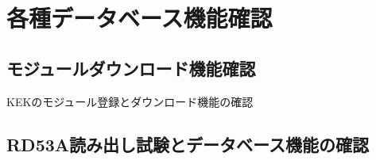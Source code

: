 \chapter{各種データベース機能確認}

\section{モジュールダウンロード機能確認}
KEKのモジュール登録とダウンロード機能の確認

\section{RD53A読み出し試験とデータベース機能の確認}
